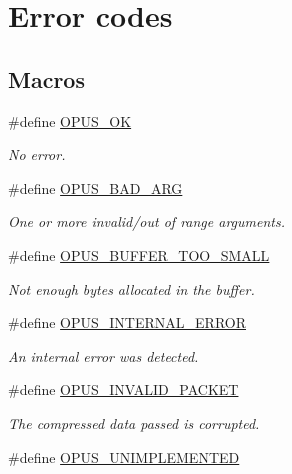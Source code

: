 \hypertarget{group__opus__errorcodes}{}\section{Error codes}
\label{group__opus__errorcodes}
\subsection*{Macros}
\begin{DoxyCompactItemize}
\item 
\#define \hyperlink{group__opus__errorcodes_gaa44cf8a185e1b5cb940ef63eb4f02d21}{O\+P\+U\+S\+\_\+\+OK}
\begin{DoxyCompactList}\small\item\em No error. \end{DoxyCompactList}\item 
\#define \hyperlink{group__opus__errorcodes_gaf2d43e479455a1a3b6874e5faf4e827d}{O\+P\+U\+S\+\_\+\+B\+A\+D\+\_\+\+A\+RG}
\begin{DoxyCompactList}\small\item\em One or more invalid/out of range arguments. \end{DoxyCompactList}\item 
\#define \hyperlink{group__opus__errorcodes_gacd897c05563ec04a67d8e92ba29f3d4f}{O\+P\+U\+S\+\_\+\+B\+U\+F\+F\+E\+R\+\_\+\+T\+O\+O\+\_\+\+S\+M\+A\+LL}
\begin{DoxyCompactList}\small\item\em Not enough bytes allocated in the buffer. \end{DoxyCompactList}\item 
\#define \hyperlink{group__opus__errorcodes_gae1f952c366ebd380df9efa1842635a0b}{O\+P\+U\+S\+\_\+\+I\+N\+T\+E\+R\+N\+A\+L\+\_\+\+E\+R\+R\+OR}
\begin{DoxyCompactList}\small\item\em An internal error was detected. \end{DoxyCompactList}\item 
\#define \hyperlink{group__opus__errorcodes_ga46fc9dd493fb8e291bd8e838f0988bb7}{O\+P\+U\+S\+\_\+\+I\+N\+V\+A\+L\+I\+D\+\_\+\+P\+A\+C\+K\+ET}
\begin{DoxyCompactList}\small\item\em The compressed data passed is corrupted. \end{DoxyCompactList}\item 
\#define \hyperlink{group__opus__errorcodes_ga3b8d73b0f44b8b925ff40fd7c02b14a0}{O\+P\+U\+S\+\_\+\+U\+N\+I\+M\+P\+L\+E\+M\+E\+N\+T\+ED}

\end{DoxyCompactItemize}
